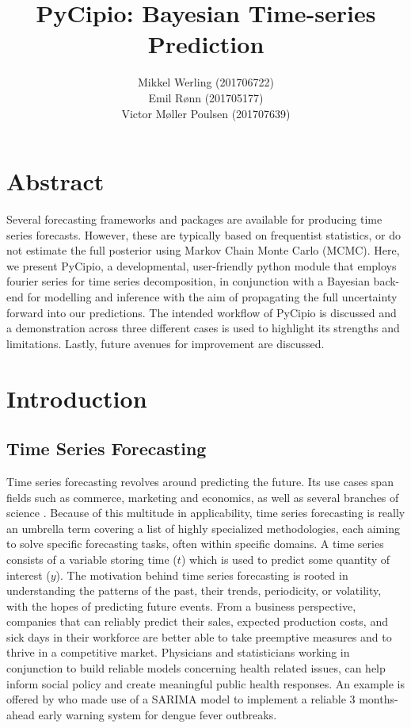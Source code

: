 \documentclass{article}
\title{PyCipio: Bayesian Time-series Prediction}
\author{Mikkel Werling (201706722) \\
    Emil Rønn (201705177) \\
    Victor Møller Poulsen (201707639)}
\date{}
\begin{document}
\maketitle
\section{Abstract}
Several forecasting frameworks and packages are available for producing time series forecasts. However, these are typically based on frequentist statistics, or do not estimate the full posterior using Markov Chain Monte Carlo (MCMC). Here, we present PyCipio, a developmental, user-friendly python module that employs fourier series for time series decomposition, in conjunction with a Bayesian back-end for modelling and inference with the aim of propagating the full uncertainty forward into our predictions. The intended workflow of PyCipio is discussed and a demonstration across three different cases is used to highlight its strengths and limitations. Lastly, future avenues for improvement are discussed.     
\section{Introduction}
\subsection{Time Series Forecasting}

Time series forecasting revolves around predicting the future. Its use cases span fields such as commerce, marketing and economics, as well as several branches of science \cite{Chatfield}. Because of this multitude in applicability, time series forecasting is really an umbrella term covering a list of highly specialized methodologies, each aiming to solve specific forecasting tasks, often within specific domains. A time series consists of a variable storing time ($t$) which is used to predict some quantity of interest ($y$). The motivation behind time series forecasting is rooted in understanding the patterns of the past, their trends, periodicity, or volatility, with the hopes of predicting future events. From a business perspective, companies that can reliably predict their sales, expected production costs, and sick days in their workforce are better able to take preemptive measures and to thrive in a competitive market. Physicians and statisticians working in conjunction to build reliable models concerning health related issues, can help inform social policy and create meaningful public health responses. An example is offered by  who made use of a SARIMA model to implement a reliable 3 months-ahead early warning system for dengue fever outbreaks.
\end{document}
